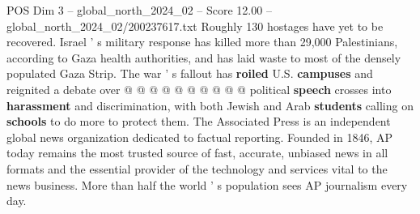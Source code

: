 \begin{textsample}{POS Dim 3 – global\_north\_2024\_02 – Score 12.00 – global\_north\_2024\_02/200237617.txt}
Roughly 130 hostages have yet to be recovered.
Israel ' s military response has killed more than 29,000 Palestinians, according to Gaza health authorities, and has laid waste to most of the densely populated Gaza Strip.
The war ' s fallout has \textbf{roiled} U.S. \textbf{campuses} and reignited a debate over @ @ @ @ @ @ @ @ @ @ political \textbf{speech} crosses into \textbf{harassment} and discrimination, with both Jewish and Arab \textbf{students} calling on \textbf{schools} to do more to protect them.
The Associated Press is an independent global news organization dedicated to factual reporting.
Founded in 1846, AP today remains the most trusted source of fast, accurate, unbiased news in all formats and the essential provider of the technology and services vital to the news business.
More than half the world ' s population sees AP journalism every day.

\end{textsample}
